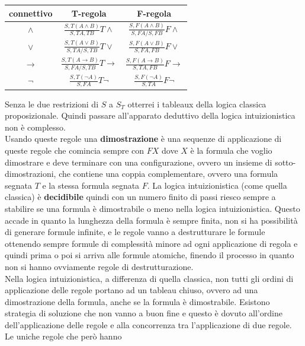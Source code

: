 \documentclass[a4paper,12pt, oneside]{book}
\begin{document}
\begin{table}[H]
  \Large
  \centering
  \begin{tabular}{c||c|c}
    connettivo& T-regola& F-regola\\
    \hline
    \hline
    $\land$ & $\frac{S,T(A\land B)}{S,TA,TB}T\land$&
                        $\frac{S,F(A\land B)}{S,FA/S,FB}F\land$\\
    \hline
    $\lor$ & $\frac{S,T(A\lor B)}{S,TA/S,TB}T\lor$&
                        $\frac{S,F(A\lor B)}{S,FA,FB}F\lor$\\
    \hline
    $\to$ & $\frac{S,T(A\to B)}{S,FA/S,TB}T\to$&
                        $\frac{S,F(A\to B)}{S,TA,FB}F\to$\\
    \hline
    $\neg$ & $\frac{S,T(\neg A)}{S,FA}T\neg$&
                        $\frac{S,F(\neg A)}{S,TA}F\neg$\\
    \hline
  \end{tabular}
\end{table}
Senza le due restrizioni di $S$ a $S_T$ otterrei i tableaux della logica classica
proposizionale. Quindi passare all'apparato deduttivo della logica
intuizionistica non è complesso.\\
Usando queste regole una \textbf{dimostrazione} è una sequenze di applicazione
di queste regole che comincia sempre con $FX$ dove $X$ è la formula che voglio
dimostrare e deve terminare con una configurazione, ovvero un insieme di
sotto-dimostrazioni, che contiene una coppia complementare, ovvero una formula
segnata $T$ e la stessa formula segnata $F$. La logica intuizionistica (come 
quella classica) è \textbf{decidibile} quindi con un numero finito di passi
riesco sempre a stabilire se una formula è dimostrabile o meno nella logica
intuizionistica. Questo accade in quanto la lunghezza della formula è sempre
finita, non si ha possibilità di generare formule infinite, e le regole vanno a
destrutturare le formule ottenendo sempre formule di complessità minore ad ogni
applicazione di regola e quindi prima o poi si arriva alle formule atomiche,
finendo il processo in quanto non si hanno ovviamente regole di
destrutturazione.\\ 
Nella logica intuizionistica, a differenza di quella classica,
non tutti gli ordini di applicazione delle regole portano ad
un tableau chiuso, ovvero ad una dimostrazione della formula, anche se la
formula è dimostrabile. Esistono strategia di soluzione che non vanno a buon
fine e questo è dovuto all'ordine dell'applicazione delle regole e alla
concorrenza tra l'applicazione di due regole. Le uniche regole che però hanno
\end{document}
